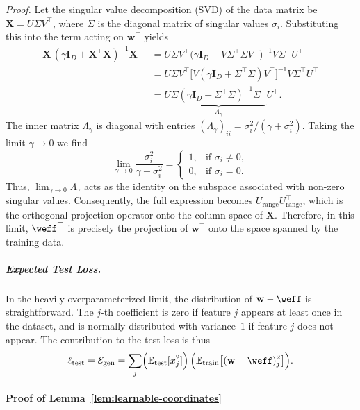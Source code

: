 \documentclass[11pt]{article}
\theoremstyle{plain}
\theoremstyle{definition}
\theoremstyle{remark}
\newcommand{\JSCheck}[1]{#1}
\begin{document}
\noindent\emph{Proof.}
Let the singular value decomposition (SVD) of the data matrix be $\mathbf{X} = U \Sigma V^\top$, where $\Sigma$ is the diagonal matrix of singular values $\sigma_i$. Substituting this into the term acting on $\mathbf{w}^\top$ yields
\begin{align*}
\mathbf{X}\,(\gamma \mathbf{I}_D+\mathbf{X}^\top \mathbf{X})^{-1}\mathbf{X}^\top
&= U \Sigma V^\top \bigl(\gamma \mathbf{I}_D + V \Sigma^\top \Sigma V^\top \bigr)^{-1} V \Sigma^\top U^\top \\
&= U \Sigma V^\top \bigl[ V (\gamma \mathbf{I}_D + \Sigma^\top \Sigma) V^\top \bigr]^{-1} V \Sigma^\top U^\top \\
&= U \underbrace{\Sigma (\gamma \mathbf{I}_D + \Sigma^\top \Sigma)^{-1} \Sigma^\top}_{\Lambda_\gamma} U^\top.
\end{align*}
The inner matrix $\Lambda_\gamma$ is diagonal with entries $(\Lambda_\gamma)_{ii} = \sigma_i^2/(\gamma + \sigma_i^2)$. Taking the limit $\gamma \to 0$ we find
\[
\lim_{\gamma \to 0} \frac{\sigma_i^2}{\gamma + \sigma_i^2} =
\begin{cases}
1, & \text{if } \sigma_i \neq 0,\\
0, & \text{if } \sigma_i = 0.
\end{cases}
\]
Thus, $\lim_{\gamma \to 0} \Lambda_\gamma$ acts as the identity on the subspace associated with non-zero singular values. Consequently, the full expression becomes $U_{\mathrm{range}} U_{\mathrm{range}}^\top$, which is the orthogonal projection operator onto the column space of $\mathbf{X}$. Therefore, in this limit, $\weff^{\top}$ is precisely the projection of $\mathbf{w}^{\top}$ onto the space spanned by the training data.


\subparagraph{\emph{Expected Test \JSCheck{Loss}.}}

In the heavily overparameterized limit, the distribution of $\mathbf{w}-\weff$ is straightforward. The $j$-th coefficient is zero if feature $j$ appears at least once in the dataset, and is normally distributed with variance~$1$ if feature $j$ does not appear. The contribution to the test \JSCheck{loss} is thus
\begin{equation*}
    \ell_{\mathrm{test}}=\mathcal{E}_{\text{gen}}=\sum_j \Bigl(\mathbb{E}_{\mathrm{test}}[x_j^2]\Bigr)\,\Bigl(\mathbb{E}_{\mathrm{train}}\bigl[(\mathbf{w}-\weff)_j^2\bigr]\Bigr).
\end{equation*}





\paragraph{Proof of Lemma~\ref{lem:learnable-coordinates}}
\end{document}
